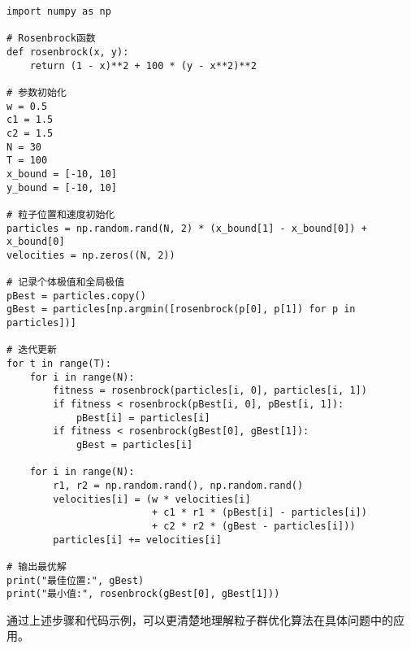 \documentclass{article}
\begin{document}
\begin{verbatim}
import numpy as np

# Rosenbrock函数
def rosenbrock(x, y):
    return (1 - x)**2 + 100 * (y - x**2)**2

# 参数初始化
w = 0.5
c1 = 1.5
c2 = 1.5
N = 30
T = 100
x_bound = [-10, 10]
y_bound = [-10, 10]

# 粒子位置和速度初始化
particles = np.random.rand(N, 2) * (x_bound[1] - x_bound[0]) + x_bound[0]
velocities = np.zeros((N, 2))

# 记录个体极值和全局极值
pBest = particles.copy()
gBest = particles[np.argmin([rosenbrock(p[0], p[1]) for p in particles])]

# 迭代更新
for t in range(T):
    for i in range(N):
        fitness = rosenbrock(particles[i, 0], particles[i, 1])
        if fitness < rosenbrock(pBest[i, 0], pBest[i, 1]):
            pBest[i] = particles[i]
        if fitness < rosenbrock(gBest[0], gBest[1]):
            gBest = particles[i]
    
    for i in range(N):
        r1, r2 = np.random.rand(), np.random.rand()
        velocities[i] = (w * velocities[i] 
                         + c1 * r1 * (pBest[i] - particles[i])
                         + c2 * r2 * (gBest - particles[i]))
        particles[i] += velocities[i]

# 输出最优解
print("最佳位置:", gBest)
print("最小值:", rosenbrock(gBest[0], gBest[1]))
\end{verbatim}

通过上述步骤和代码示例，可以更清楚地理解粒子群优化算法在具体问题中的应用。
\end{document}
